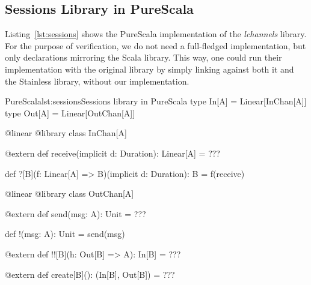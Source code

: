 \documentclass[a4paper,twoside]{article}
\newcommand{\RefCode}[1]{Listing~\ref{#1}}
\newcommand{\stt}[1]{\texttt{\small{#1}}}
\begin{document}
% 
%
%
%

\subsection{Sessions Library in PureScala}
\label{sessions_lib}

\RefCode{lst:sessions} shows the PureScala implementation of the \textit{lchannels} library. For the purpose of verification, we do not need a full-fledged implementation, but only declarations mirroring the Scala library. This way, one could run their implementation with the original library by simply linking against both it and the Stainless library, without our implementation.

\begin{Code}{PureScala}{lst:sessions}{Sessions library in PureScala}
type In[A]  = Linear[InChan[A]]
type Out[A] = Linear[OutChan[A]]

@linear @library
class InChan[A] {

  @extern
  def receive(implicit d: Duration): Linear[A] = {
    ???
  }

  def ?[B](f: Linear[A] => B)(implicit d: Duration): B = {
    f(receive)
  }
}

@linear @library
class OutChan[A] {

  @extern
  def send(msg: A): Unit = {
    ???
  }

  def !(msg: A): Unit = {
    send(msg)
  }

  @extern
  def !![B](h: Out[B] => A): In[B] = {
    ???
  }

  @extern
  def create[B](): (In[B], Out[B]) = {
    ???
  }
}
\end{Code}
\end{document}
